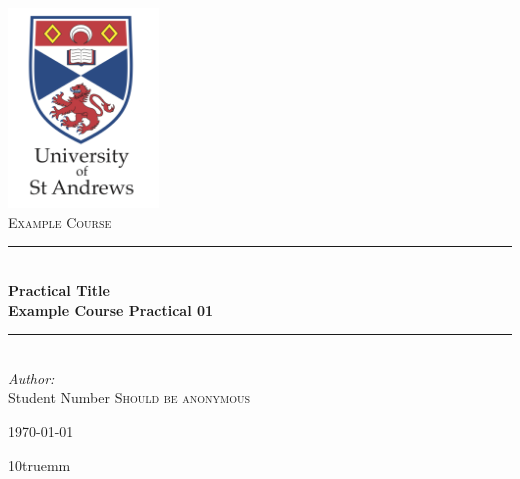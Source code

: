 \documentclass[12pt, a4paper]{article}
\def\thepretitle{Example Course}
\def\themaintitle{Practical Title}
\def\thesubtitle{Example Course Practical 01}
\def\firstname{Student Number}
\def\lastname{Should be anonymous}
\newcommand{\HRule}{\rule{\linewidth}{0.5mm}} %
\begin{document}
\begin{titlepage}
\begin{center}
\includegraphics[width=0.3\textwidth]{styles/sta-logo.png}\\[2cm]
\textsc{\LARGE \thepretitle}\\[1.5cm]

\HRule \\[0.4cm]
{ \huge \bfseries \themaintitle}\\[0.5cm]
{ \large \bfseries \thesubtitle}\\
\HRule \\[1.5cm]

\emph{Author:}\\ %

\firstname\textsc{ \lastname}\\

\vfill

{\large \today}

\end{center}
\end{titlepage}

\columnsep 10truemm

\onecolumn
\singlespacing %

\tableofcontents
\pagebreak





\onecolumn
\newpage
{}
\appendix
\appendixpage

\newpage
%


\end{document}

